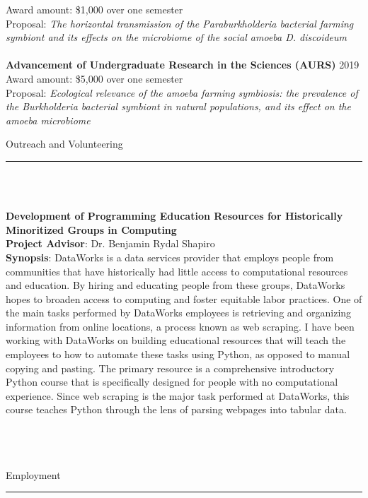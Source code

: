 \documentclass{article}
\begin{document}
Award amount: \$1,000 over one semester\\
Proposal: \emph{The horizontal transmission of the Paraburkholderia bacterial farming symbiont and its effects on the microbiome of the social amoeba D. discoideum}\\
\\
\textbf{Advancement of Undergraduate Research in the Sciences (AURS)} \hfill 2019\\
Award amount: \$5,000 over one semester\\
Proposal: \emph{Ecological relevance of the amoeba farming symbiosis: the prevalence of the Burkholderia bacterial symbiont in natural populations, and its effect on the amoeba microbiome}
\\

\begin{flushleft}
{\Large Outreach and Volunteering} \rule{16.51cm}{0.4pt}\\
\end{flushleft}
\\
\textbf{Development of Programming Education Resources for Historically Minoritized Groups in Computing}\\
\textbf{Project Advisor}: Dr. Benjamin Rydal Shapiro \\
\textbf{Synopsis}: DataWorks is a data services provider that employs people from communities that have historically 
had little access to computational resources and education. By hiring and educating people from these groups, DataWorks
hopes to broaden access to computing and foster equitable labor practices. One of the main tasks performed by DataWorks employees 
is retrieving and organizing information from online locations, a process known as web scraping. I have been working with DataWorks 
on building educational resources that will teach the employees to how to automate these tasks using Python, as opposed to manual copying and pasting.
The primary resource is a comprehensive introductory Python course that is specifically designed for people with no computational experience. 
Since web scraping is the major task performed at DataWorks, this course teaches Python through the lens of parsing webpages into tabular data.
\\
\\
\\
\\
\begin{flushleft}
{\Large Employment} \rule{16.51cm}{0.4pt}\\
\end{flushleft}
\end{document}
